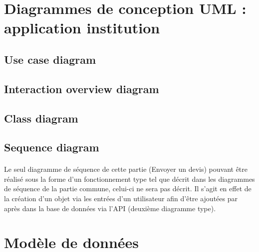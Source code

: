\documentclass[]{report}
\begin{document}


\newpage



\section{Diagrammes de conception UML : application institution}



\subsection{Use case diagram}



\newpage

\subsection{Interaction overview diagram}



\newpage

\subsection{Class diagram}



\newpage

\subsection{Sequence diagram}

\paragraph{}Le seul diagramme de séquence de cette partie (Envoyer un devis) pouvant être réalisé sous la forme d’un fonctionnement type tel que décrit dans les diagrammes de séquence de la partie commune, celui-ci ne sera pas décrit. Il s’agit en effet de la création d’un objet via les entrées d’un utilisateur afin d’être ajoutées par après dans la base de données via l’API (deuxième diagramme type).

\newpage

\section{Modèle de données}
\end{document}
